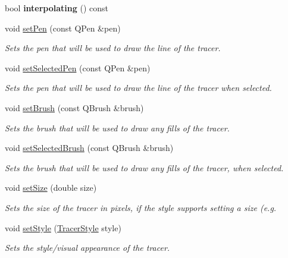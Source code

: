 \begin{DoxyCompactItemize}
\item 
\hypertarget{classQCPItemTracer_ab318c233fa35c17a317af38ce7b3c312}{}bool {\bfseries interpolating} () const \label{classQCPItemTracer_ab318c233fa35c17a317af38ce7b3c312}

\item 
void \hyperlink{classQCPItemTracer_af8048636fc1ef0152e51809b008df2ca}{set\+Pen} (const Q\+Pen \&pen)
\begin{DoxyCompactList}\small\item\em Sets the pen that will be used to draw the line of the tracer. \end{DoxyCompactList}\item 
void \hyperlink{classQCPItemTracer_ae1bf70db7f13f928660168cd3e5069f3}{set\+Selected\+Pen} (const Q\+Pen \&pen)
\begin{DoxyCompactList}\small\item\em Sets the pen that will be used to draw the line of the tracer when selected. \end{DoxyCompactList}\item 
void \hyperlink{classQCPItemTracer_a2c303f7470a30084daa201ed556b3c36}{set\+Brush} (const Q\+Brush \&brush)
\begin{DoxyCompactList}\small\item\em Sets the brush that will be used to draw any fills of the tracer. \end{DoxyCompactList}\item 
void \hyperlink{classQCPItemTracer_a0f55c084980a7a312af859d3e7b558ef}{set\+Selected\+Brush} (const Q\+Brush \&brush)
\begin{DoxyCompactList}\small\item\em Sets the brush that will be used to draw any fills of the tracer, when selected. \end{DoxyCompactList}\item 
void \hyperlink{classQCPItemTracer_ae47fe0617f5fef5fdb766999569be10a}{set\+Size} (double size)
\begin{DoxyCompactList}\small\item\em Sets the size of the tracer in pixels, if the style supports setting a size (e.\+g. \end{DoxyCompactList}\item 
void \hyperlink{classQCPItemTracer_a41a2ac4f1acd7897b4e2a2579c03204e}{set\+Style} (\hyperlink{classQCPItemTracer_a2f05ddb13978036f902ca3ab47076500}{Tracer\+Style} style)
\begin{DoxyCompactList}\small\item\em Sets the style/visual appearance of the tracer. \end{DoxyCompactList}\item 

\end{DoxyCompactItemize}
